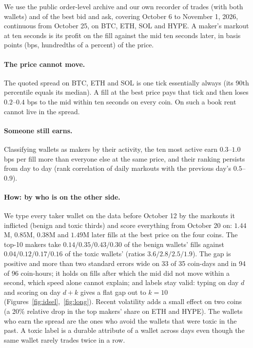 \documentclass[11pt]{article}
\begin{document}
We use the public order-level archive \cite{albers} and our own recorder of trades (with both wallets) and of the best bid and ask, covering October 6 to November 1, 2026, continuous from October 25, on BTC, ETH, SOL and HYPE. A maker's markout at ten seconds is its profit on the fill against the mid ten seconds later, in basis points (bps, hundredths of a percent) of the price.

\paragraph{The price cannot move.} The quoted spread on BTC, ETH and SOL is one tick essentially always (its 90th percentile equals its median). A fill at the best price pays that tick and then loses $0.2$--$0.4$ bps to the mid within ten seconds on every coin. On such a book rent cannot live in the spread.

\paragraph{Someone still earns.} Classifying wallets as makers by their activity, the ten most active earn $0.3$--$1.0$ bps per fill more than everyone else at the same price, and their ranking persists from day to day (rank correlation of daily markouts with the previous day's $0.5$--$0.9$).

\paragraph{How: by who is on the other side.} We type every taker wallet on the data before October 12 by the markouts it inflicted (benign and toxic thirds) and score everything from October 20 on: $1.44$M, $0.85$M, $0.38$M and $1.49$M later fills at the best price on the four coins. The top-10 makers take $0.14/0.35/0.43/0.30$ of the benign wallets' fills against $0.04/0.12/0.17/0.16$ of the toxic wallets' (ratios $3.6/2.8/2.5/1.9$). The gap is positive and more than two standard errors wide on 33 of 35 coin-days and in 94 of 96 coin-hours; it holds on fills after which the mid did not move within a second, which speed alone cannot explain; and labels stay valid: typing on day $d$ and scoring on day $d+k$ gives a flat gap out to $k=10$ (Figures~\ref{fig:idsel},~\ref{fig:long}). Recent volatility adds a small effect on two coins (a 20\% relative drop in the top makers' share on ETH and HYPE). The wallets who earn the spread are the ones who avoid the wallets that were toxic in the past. A toxic label is a durable attribute of a wallet across days even though the same wallet rarely trades twice in a row.
\end{document}
